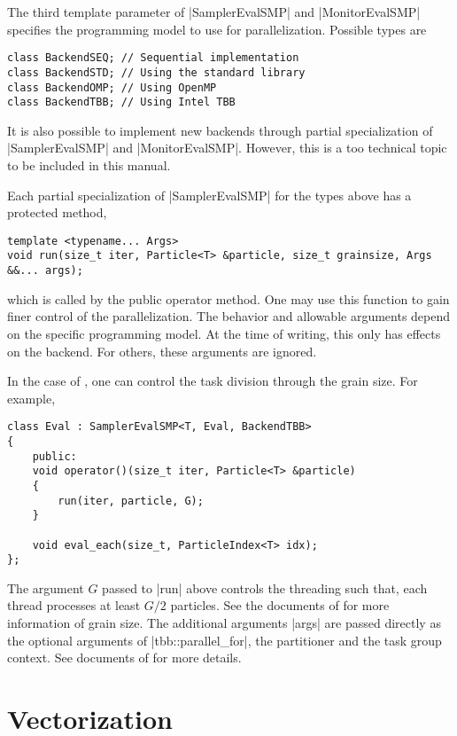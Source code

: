 The third template parameter of |SamplerEvalSMP| and |MonitorEvalSMP| specifies
the programming model to use for parallelization. Possible types are
\begin{verbatim}
class BackendSEQ; // Sequential implementation
class BackendSTD; // Using the standard library
class BackendOMP; // Using OpenMP
class BackendTBB; // Using Intel TBB
\end{verbatim}
It is also possible to implement new backends through partial specialization of
|SamplerEvalSMP| and |MonitorEvalSMP|. However, this is a too technical topic
to be included in this manual.

Each partial specialization of |SamplerEvalSMP| for the types above has a
protected method,
\begin{verbatim}
template <typename... Args>
void run(size_t iter, Particle<T> &particle, size_t grainsize, Args &&... args);
\end{verbatim}
which is called by the public operator method. One may use this function to
gain finer control of the parallelization. The behavior and allowable arguments
depend on the specific programming model. At the time of writing, this only has
effects on the \tbb backend. For others, these arguments are ignored.

In the case of \tbb, one can control the task division through the grain size.
For example,
\begin{verbatim}
class Eval : SamplerEvalSMP<T, Eval, BackendTBB>
{
    public:
    void operator()(size_t iter, Particle<T> &particle)
    {
        run(iter, particle, G);
    }

    void eval_each(size_t, ParticleIndex<T> idx);
};
\end{verbatim}
The argument $G$ passed to |run| above controls the threading such that, each
thread processes at least $G / 2$ particles. See the documents of \tbb for more
information of grain size. The additional arguments |args| are passed directly
as the optional arguments of |tbb::parallel_for|, the partitioner and the task
group context. See documents of \tbb for more details.

\section{Vectorization}
\label{sec:Vectorization}

